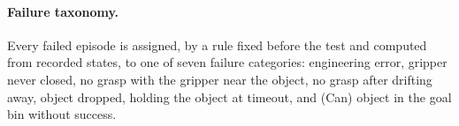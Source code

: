 \paragraph{Failure taxonomy.} Every failed episode is assigned, by a rule fixed before the
test and computed from recorded states, to one of seven failure categories: engineering
error, gripper never closed, no grasp with the gripper near the object, no grasp after
drifting away, object dropped, holding the object at timeout, and (Can) object in the goal
bin without success.
